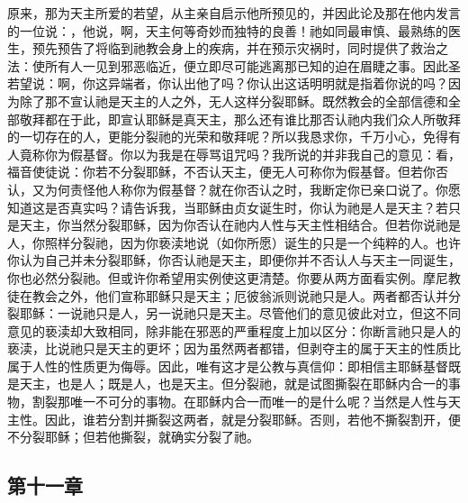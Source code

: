 \par

原来，那为天主所爱的若望，从主亲自启示他所预见的，并因此论及那在他内发言的一位说：，他说，啊，天主何等奇妙而独特的良善！祂如同最审慎、最熟练的医生，预先预告了将临到祂教会身上的疾病，并在预示灾祸时，同时提供了救治之法：使所有人一见到邪恶临近，便立即尽可能逃离那已知的迫在眉睫之事。因此圣若望说：啊，你这异端者，你认出他了吗？你认出这话明明就是指着你说的吗？因为除了那不宣认祂是天主的人之外，无人这样分裂耶稣。既然教会的全部信德和全部敬拜都在于此，即宣认耶稣是真天主，那么还有谁比那否认祂内我们众人所敬拜的一切存在的人，更能分裂祂的光荣和敬拜呢？所以我恳求你，千万小心，免得有人竟称你为假基督。你以为我是在辱骂诅咒吗？我所说的并非我自己的意见：看，福音使徒说：你若不分裂耶稣，不否认天主，便无人可称你为假基督。但若你否认，又为何责怪他人称你为假基督？就在你否认之时，我断定你已亲口说了。你愿知道这是否真实吗？请告诉我，当耶稣由贞女诞生时，你认为祂是人是天主？若只是天主，你当然分裂耶稣，因为你否认在祂内人性与天主性相结合。但若你说祂是人，你照样分裂祂，因为你亵渎地说（如你所愿）诞生的只是一个纯粹的人。也许你认为自己并未分裂耶稣，你否认祂是天主，即便你并不否认人与天主一同诞生，你也必然分裂祂。但或许你希望用实例使这更清楚。你要从两方面看实例。摩尼教徒在教会之外，他们宣称耶稣只是天主；厄彼翁派则说祂只是人。两者都否认并分裂耶稣：一说祂只是人，另一说祂只是天主。尽管他们的意见彼此对立，但这不同意见的亵渎却大致相同，除非能在邪恶的严重程度上加以区分：你断言祂只是人的亵渎，比说祂只是天主的更坏；因为虽然两者都错，但剥夺主的属于天主的性质比属于人性的性质更为侮辱。因此，唯有这才是公教与真信仰：即相信主耶稣基督既是天主，也是人；既是人，也是天主。但分裂祂，就是试图撕裂在耶稣内合一的事物，割裂那唯一不可分的事物。在耶稣内合一而唯一的是什么呢？当然是人性与天主性。因此，谁若分割并撕裂这两者，就是分裂耶稣。否则，若他不撕裂割开，便不分裂耶稣；但若他撕裂，就确实分裂了祂。\par


\subsection{第十一章}

